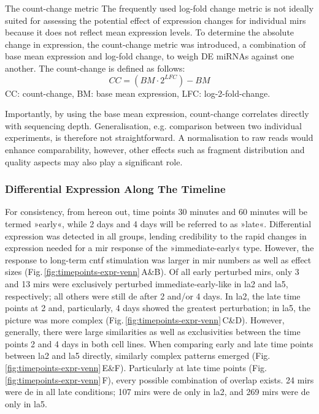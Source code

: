\begin{mybox}{The count-change metric}\label{box:count-change}
The frequently used log-fold change metric is not ideally suited for assessing the potential effect of expression changes for individual \acp{mir} because it does not reflect mean expression levels. To determine the absolute change in expression, the count-change metric was introduced, a combination of base mean expression and log-fold change, to weigh DE miRNAs against one another. The count-change is defined as follows: $$CC = (BM \cdot 2^{LFC}) - BM$$
CC: count-change, BM: base mean expression, LFC: log-2-fold-change.

Importantly, by using the base mean expression, count-change correlates directly with sequencing depth. Generalisation, e.g. comparison between two individual experiments, is therefore not straightforward. A normalisation to raw reads would enhance comparability, however, other effects such as fragment distribution and quality aspects may also play a significant role.
\end{mybox}

\subsubsection{Differential Expression Along The Timeline} \label{sec:cellculture:along}
For consistency, from hereon out, time points 30 minutes and 60 minutes will be termed »early«, while 2 days and 4 days will be referred to as »late«. Differential expression was detected in all groups, lending credibility to the rapid changes in expression needed for a \ac{mir} response of the »immediate-early« type. However, the response to long-term \ac{cntf} stimulation was larger in \ac{mir} numbers as well as effect sizes (Fig.\,\ref{fig:timepoints-expr-venn}\,A\&B). Of all early perturbed \acp{mir}, only 3 and 13 \acp{mir} were exclusively perturbed immediate-early-like in \ac{la2} and \ac{la5}, respectively; all others were still \ac{de} after 2 and/or 4 days. In \ac{la2}, the late time points at 2 and, particularly, 4 days showed the greatest perturbation; in \ac{la5}, the picture was more complex (Fig.\,\ref{fig:timepoints-expr-venn}\,C\&D). However, generally, there were large similarities as well as exclusivities between the time points 2 and 4 days in both cell lines. When comparing early and late time points between \ac{la2} and \ac{la5} directly, similarly complex patterns emerged (Fig.\,\ref{fig:timepoints-expr-venn}\,E\&F). Particularly at late time points (Fig.\,\ref{fig:timepoints-expr-venn}\,F), every possible combination of overlap exists. 24 \acp{mir} were \ac{de} in all late conditions; 107 \acp{mir} were \ac{de} only in \ac{la2}, and 269 \acp{mir} were \ac{de} only in \ac{la5}. 

